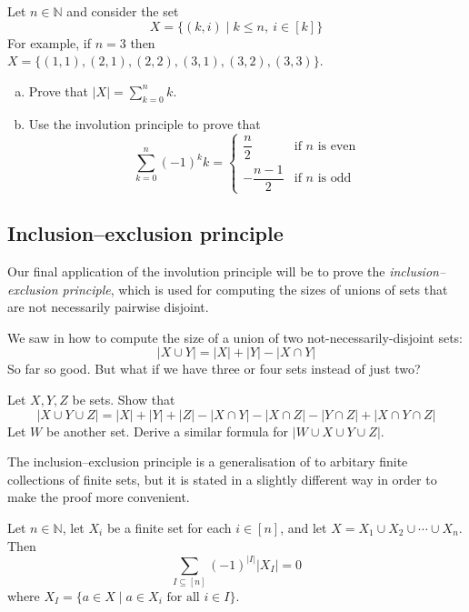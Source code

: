 \begin{exercise}
Let $n \in \mathbb{N}$ and consider the set
\[ X = \{ (k,i) \mid k \le n,~ i \in [k] \} \]
For example, if $n=3$ then $X = \{ (1,1), (2,1), (2,2), (3,1), (3,2), (3,3) \}$.

\begin{enumerate}[(a)]
\item Prove that $|X| = \displaystyle \sum_{k=0}^n k$.
\item Use the involution principle to prove that
\[ \sum_{k=0}^n (-1)^k k = \begin{cases} \dfrac{n}{2} & \text{if $n$ is even} \\ -\dfrac{n-1}{2} & \text{if $n$ is odd } \end{cases} \]
\end{enumerate}
\end{exercise}

\subsection*{Inclusion--exclusion principle}

Our final application of the involution principle will be to prove the \textit{inclusion--exclusion principle}, which is used for computing the sizes of unions of sets that are not necessarily pairwise disjoint.

We saw in  how to compute the size of a union of two not-necessarily-disjoint sets:
\[ |X \cup Y| = |X| + |Y| - |X \cap Y| \]
So far so good. But what if we have three or four sets instead of just two?

\begin{exercise}
\label{exSizeOfUnionOf3Or4Sets}
Let $X,Y,Z$ be sets. Show that
\[ |X \cup Y \cup Z| = |X| + |Y| + |Z| - |X \cap Y| - |X \cap Z| - |Y \cap Z| + |X \cap Y \cap Z| \]
Let $W$ be another set. Derive a similar formula for $|W \cup X \cup Y \cup Z|$.
\end{exercise}

The inclusion--exclusion principle is a generalisation of  to arbitary finite collections of finite sets, but it is stated in a slightly different way in order to make the proof more convenient.

\begin{theorem}
\label{thmInclusionExclusion}
Let $n \in \mathbb{N}$, let $X_i$ be a finite set for each $i \in [n]$, and let $X = X_1 \cup X_2 \cup \cdots \cup X_n$. Then
\[ \sum_{I \subseteq [n]} (-1)^{|I|} |X_I| = 0 \]
where $X_I = \{ a \in X \mid a \in X_i \text{ for all } i \in I \}$. 
\end{theorem}

